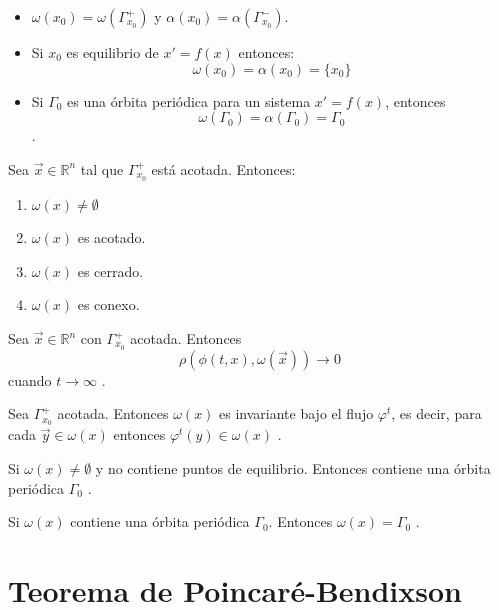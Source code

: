\begin{itemize}
	\item $\omega(x_0)=\omega(\varGamma_{x_0}^{+})$
	      y $\alpha(x_0)=\alpha(\varGamma_{x_0}^{-})$.\\
	\item Si $x_0$ es equilibrio de $x'=f(x)$ entonces:
	    $$\omega(x_0)=\alpha(x_0)=\{x_0\}$$
	\item Si $\varGamma_0$ es una órbita periódica para un sistema $x'=f(x)$, entonces
	      $$\omega(\varGamma_0)=\alpha(\varGamma_0)=\varGamma_0$$.
\end{itemize}

\begin{lemma}
	Sea $\vec{x}\in\mathbb{R}^n$ tal que $\Gamma_{x_0}^+$ está acotada.
	Entonces:
	\begin{enumerate}
		\item $\omega(x)\neq\emptyset$
		\item $\omega(x)$ es acotado.
		\item $\omega(x)$ es cerrado.
		\item $\omega(x)$ es conexo.
	\end{enumerate}
\end{lemma}

\begin{lemma}
	Sea $\vec{x}\in\mathbb{R}^n$ con $\Gamma_{x_0}^+$ acotada.
	Entonces
	$$\rho(\phi(t,x),\omega(\vec{x}))\to0$$
	cuando $t \to \infty$ \cite{hirsch2012differential}.
\end{lemma}

\begin{lemma}[Invarianza]
	Sea $\Gamma_{x_0}^+$ acotada. Entonces $\omega(x)$
	es invariante bajo el flujo
	$\varphi^t$, es decir, para cada $\vec{y}\in\omega(x)$ entonces
	$\varphi ^t(y)\in\omega(x)$ \cite{arnold1992ordinary}.
\end{lemma}

\begin{lemma}
	Si $\omega(x)\neq\emptyset$ y no contiene puntos de equilibrio. Entonces contiene una órbita periódica $\varGamma_0$ \cite{strogatz2018nonlinear}.
\end{lemma}

\begin{lemma}
	Si $\omega(x)$ contiene una órbita periódica $\varGamma_0$. Entonces $\omega(x)=\varGamma_0$ \cite{guckenheimer1983nonlinear}.
\end{lemma}

\section{Teorema de Poincaré-Bendixson}

